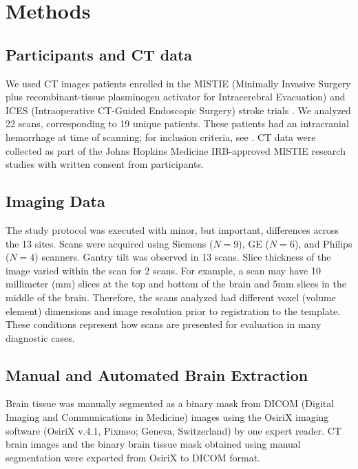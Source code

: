 \documentclass{elsarticle}\usepackage[]{graphicx}\usepackage[]{color}
\begin{document}
\section{Methods}
\subsection{ Participants and CT data}
We used CT images patients enrolled in the MISTIE (Minimally Invasive Surgery plus recombinant-tissue plasminogen activator for Intracerebral Evacuation) and ICES (Intraoperative CT-Guided Endoscopic Surgery) stroke trials \citep{morgan_preliminary_2008}.  We analyzed 22 scans, corresponding to 19 unique patients.  These patients had an intracranial hemorrhage at time of scanning; for inclusion criteria, see \citet{mould_minimally_2013}. CT data were collected as part of the Johns Hopkins Medicine IRB-approved MISTIE research studies with written consent from participants.  


\subsection{Imaging Data}
The study protocol was executed with minor, but important, differences across the 13 sites.  Scans were acquired using Siemens ($N=9$), GE ($N=6$), and Philips ($N=4$) scanners. Gantry tilt was observed in 13 scans.  
Slice thickness of the image varied within the scan for 2 scans. For example, a scan may have 10 millimeter (mm) slices at the top and bottom of the brain and 5mm slices in the middle of the brain.  Therefore, the scans analyzed had different voxel (volume element) dimensions and image resolution prior to registration to the template.  These conditions represent how scans are presented for evaluation in many diagnostic cases.


\subsection{Manual and Automated Brain Extraction}
Brain tissue was manually segmented as a binary mask from DICOM (Digital Imaging and Communications in Medicine) images using the OsiriX imaging software (OsiriX v.4.1, Pixmeo; Geneva, Switzerland) by one expert reader. 
CT brain images and the binary brain tissue mask obtained using manual segmentation were exported from OsiriX to DICOM format.  
\end{document}
